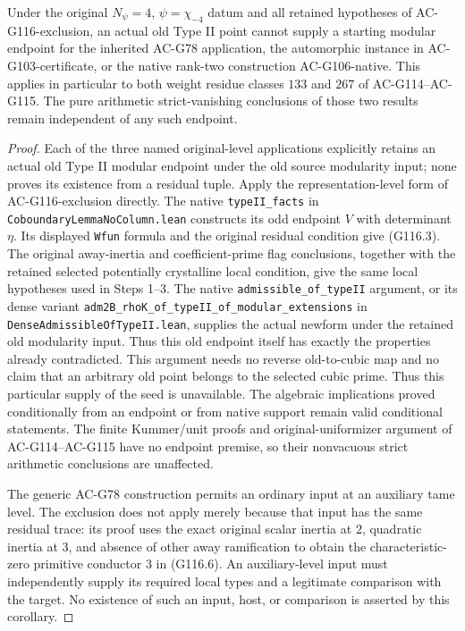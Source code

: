 \begin{corollary}
\label{thm:ACG116seed}
Under the original \(N_\psi=4\), \(\psi=\chi_{-4}\) datum and
all retained hypotheses of AC-G116-exclusion, an actual old Type II
point cannot supply a starting modular endpoint for the inherited
AC-G78 application, the automorphic instance in AC-G103-certificate,
or the native rank-two construction AC-G106-native.
This applies in particular to both weight residue classes \(133\) and \(267\)
of AC-G114--AC-G115.  The pure arithmetic strict-vanishing conclusions
of those two results remain independent of any such endpoint.
\end{corollary}
\begin{proof}
Each of the three named original-level applications explicitly
retains an actual old Type II modular endpoint under the old source
modularity input; none proves its existence from a residual tuple.
Apply the representation-level form of AC-G116-exclusion directly.
The native \texttt{typeII\_facts} in
\texttt{CoboundaryLemmaNoColumn.lean} constructs its odd endpoint
\(V\) with determinant \(\eta\).  Its displayed \texttt{Wfun}
formula and the original residual condition give (G116.3).
The original away-inertia and coefficient-prime flag conclusions,
together with the retained selected potentially crystalline local
condition, give the same local hypotheses used in Steps 1--3.
The native \texttt{admissible\_of\_typeII} argument, or its dense
variant \texttt{adm2B\_rhoK\_of\_typeII\_of\_modular\_extensions}
in \texttt{DenseAdmissibleOfTypeII.lean}, supplies the actual
newform under the retained old modularity input.  Thus this old
endpoint itself has exactly the properties already contradicted.
This argument needs no reverse old-to-cubic map and no claim that
an arbitrary old point belongs to the selected cubic prime.
Thus this particular supply of the seed is unavailable.
The algebraic implications proved conditionally from an endpoint
or from native support remain valid conditional statements.
The finite Kummer/unit proofs and original-uniformizer argument of
AC-G114--AC-G115 have no endpoint premise, so their nonvacuous
strict arithmetic conclusions are unaffected.

The generic AC-G78 construction permits an ordinary input at an
auxiliary tame level.  The exclusion does not apply merely because
that input has the same residual trace: its proof uses the exact
original scalar inertia at \(2\), quadratic inertia at \(3\), and absence
of other away ramification to obtain the characteristic-zero
primitive conductor \(3\) in (G116.6).  An auxiliary-level input must
independently supply its required local types and a legitimate
comparison with the target.  No existence of such an input, host,
or comparison is asserted by this corollary.
\end{proof}

